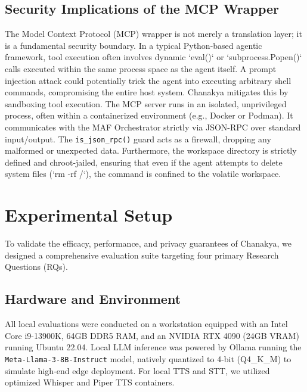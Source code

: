 \documentclass[conference]{IEEEtran}
\begin{document}
\subsection{Security Implications of the MCP Wrapper}
The Model Context Protocol (MCP) wrapper is not merely a translation layer; it is a fundamental security boundary. In a typical Python-based agentic framework, tool execution often involves dynamic `eval()` or `subprocess.Popen()` calls executed within the same process space as the agent itself. A prompt injection attack could potentially trick the agent into executing arbitrary shell commands, compromising the entire host system. Chanakya mitigates this by sandboxing tool execution. The MCP server runs in an isolated, unprivileged process, often within a containerized environment (e.g., Docker or Podman). It communicates with the MAF Orchestrator strictly via JSON-RPC over standard input/output. The \texttt{is\_json\_rpc()} guard acts as a firewall, dropping any malformed or unexpected data. Furthermore, the workspace directory is strictly defined and chroot-jailed, ensuring that even if the agent attempts to delete system files (`rm -rf /`), the command is confined to the volatile workspace.
\section{Experimental Setup}

To validate the efficacy, performance, and privacy guarantees of Chanakya, we designed a comprehensive evaluation suite targeting four primary Research Questions (RQs).

\subsection{Hardware and Environment}
All local evaluations were conducted on a workstation equipped with an Intel Core i9-13900K, 64GB DDR5 RAM, and an NVIDIA RTX 4090 (24GB VRAM) running Ubuntu 22.04. Local LLM inference was powered by Ollama running the \texttt{Meta-Llama-3-8B-Instruct} model, natively quantized to 4-bit (Q4\_K\_M) to simulate high-end edge deployment. For local TTS and STT, we utilized optimized Whisper and Piper TTS containers.
\end{document}
